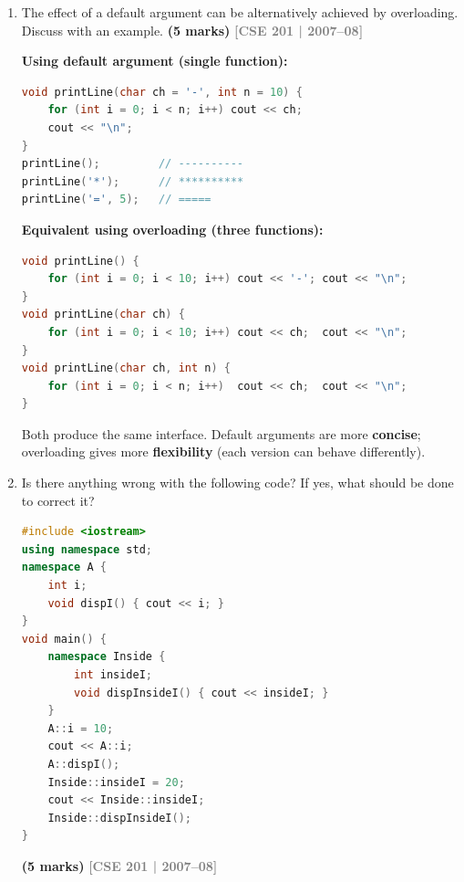 \documentclass[12pt,a3paper]{article}
\newcommand{\yr}[1]{\hfill\textcolor{gray}{\small\textbf{[#1]}}}
\newcommand{\mk}[1]{\textcolor{orange!70!black}{\small\textbf{(#1 marks)}}}
\begin{document}
\begin{enumerate}
\begin{tcolorbox}
With reference parameters, the caller passes variables directly
(no \texttt{\&} needed), yet the function receives the actual
variables.  The call-by-reference mechanism is \textbf{fully
automated} by the compiler.

\end{tcolorbox}

\item The effect of a default argument can be alternatively achieved by overloading. Discuss with an example. \mk{5}
\yr{CSE 201 | 2007--08}


\begin{tcolorbox}[enhanced,breakable,ansbox,colback=cC!4,colframe=cC,
  boxrule=0.8pt,arc=5pt,
  title={\textbf{Answer --- Default argument vs overloading}},
  fonttitle=\bfseries\color{white},colbacktitle=cC]

\textbf{Using default argument (single function):}
\begin{lstlisting}[language=C++]
void printLine(char ch = '-', int n = 10) {
    for (int i = 0; i < n; i++) cout << ch;
    cout << "\n";
}
printLine();         // ----------
printLine('*');      // **********
printLine('=', 5);   // =====
\end{lstlisting}

\textbf{Equivalent using overloading (three functions):}
\begin{lstlisting}[language=C++]
void printLine() {
    for (int i = 0; i < 10; i++) cout << '-'; cout << "\n";
}
void printLine(char ch) {
    for (int i = 0; i < 10; i++) cout << ch;  cout << "\n";
}
void printLine(char ch, int n) {
    for (int i = 0; i < n; i++)  cout << ch;  cout << "\n";
}
\end{lstlisting}

Both produce the same interface.  Default arguments are more
\textbf{concise}; overloading gives more \textbf{flexibility}
(each version can behave differently).

\end{tcolorbox}


\item Is there anything wrong with the following code? If yes, what should be done to correct it?
\begin{lstlisting}[language=C++]
#include <iostream>
using namespace std;
namespace A {
    int i;
    void dispI() { cout << i; }
}
void main() {
    namespace Inside {
        int insideI;
        void dispInsideI() { cout << insideI; }
    }
    A::i = 10;
    cout << A::i;
    A::dispI();
    Inside::insideI = 20;
    cout << Inside::insideI;
    Inside::dispInsideI();
}
\end{lstlisting}
\mk{5}
\yr{CSE 201 | 2007--08}


\end{enumerate}
\end{document}
